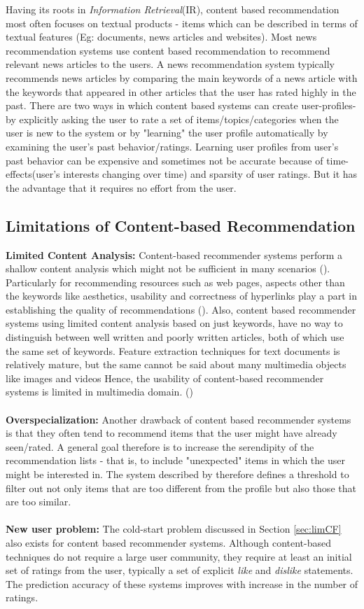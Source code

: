 Having its roots in \textit{Information Retrieval}(IR), content based recommendation most often focuses on textual products - items which can be described in terms of textual features (Eg: documents, news articles and websites).
Most news recommendation systems use content based recommendation to recommend relevant news articles to the users.
A news recommendation system typically recommends news articles by comparing the main keywords of a news article with the keywords that appeared in other articles that the user has rated highly in the past.
There are two ways in which content based systems can create user-profiles- 
by explicitly asking the user to rate a set of items/topics/categories when the user is new to the system
or by "learning" the user profile automatically by examining the user's past behavior/ratings.
Learning user profiles from user's past behavior can be expensive and sometimes not be accurate because of time-effects(user's interests changing over time) and sparsity of user ratings.
But it has the advantage that it requires no effort from the user.

\subsection{Limitations of Content-based Recommendation}
\textbf{Limited Content Analysis:} Content-based recommender systems perform a shallow content analysis which might not be sufficient in many scenarios (\cite{jannach}). Particularly for recommending resources such as web pages, aspects other than the keywords like aesthetics, usability and correctness of hyperlinks play a part in establishing the quality of recommendations (\cite{jannach}).
Also, content based recommender systems using limited content analysis based on just keywords, have no way to distinguish between well written and poorly written articles, both of which use the same set of keywords. 
Feature extraction techniques for text documents is relatively mature, but the same cannot be said about many multimedia objects like images and videos
Hence, the usability of content-based recommender systems is limited in multimedia domain. (\cite{adom2005})\\
\\
\textbf{Overspecialization:}  Another drawback of content based recommender systems is that they often tend to recommend items that the user might have already seen/rated. 
A general goal therefore is to increase the serendipity of the recommendation lists - that is, to include "unexpected" items in which the user might be interested in.
The system described by \cite{billsus} therefore defines a threshold to filter out not only items that are too different from the profile but also those that are too similar.\\
\\
\textbf{New user problem:} The cold-start problem discussed in Section \ref{sec:limCF} also exists for content based recommender systems.
Although content-based techniques do not require a large user community, they require at least an initial set of ratings from the user, typically a set of explicit \textit{like} and \textit{dislike} statements.
The prediction accuracy of these systems improves with increase in the number of ratings.

